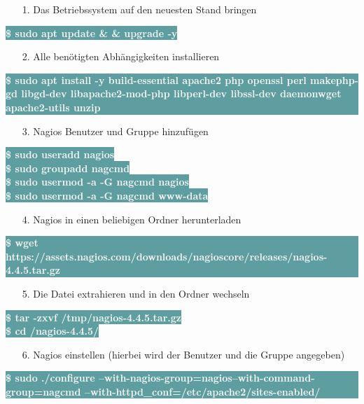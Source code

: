 \documentclass[fontsize=12pt,paper=a4,open=any,parskip=half,
  twoside=false,toc=listof,toc=bibliography,fleqn,leqno,
  captions=nooneline,captions=tableabove,british]{scrbook}
\begin{document}
\begin{itemize}
\item[1.] Das Betriebssystem auf den neuesten Stand bringen
\end{itemize}
\colorbox{CadetBlue}{\textcolor{white}{\textbf{\textsf{\$ sudo apt update \& \& upgrade -y}}}}
\begin{itemize}
\item[2.] Alle benötigten Abhängigkeiten installieren
\end{itemize}
\colorbox{CadetBlue}{\parbox{\myboxwidth}{\textbf{\textsf{\textcolor{white}{\$ sudo apt install \hyp{}y build\hyp{}essential apache2 php openssl perl makephp\hyp{}gd libgd\hyp{}dev libapache2\hyp{}mod\hyp{}php libperl\hyp{}dev libssl\hyp{}dev daemonwget apache2\hyp{}utils unzip}}}}}
\begin{itemize}
\item[3.] Nagios Benutzer und Gruppe hinzufügen
\end{itemize}
\colorbox{CadetBlue}{\textcolor{white}{\textbf{\textsf{\$ sudo useradd nagios}}}}\\
\colorbox{CadetBlue}{\textcolor{white}{\textbf{\textsf{\$ sudo groupadd nagcmd}}}}\\
\colorbox{CadetBlue}{\textcolor{white}{\textbf{\textsf{\$ sudo usermod -a -G nagcmd nagios}}}}\\
\colorbox{CadetBlue}{\textcolor{white}{\textbf{\textsf{\$ sudo usermod -a -G nagcmd www-data}}}}
\begin{itemize}
\item[4.] Nagios in einen beliebigen Ordner herunterladen
\end{itemize}
\colorbox{CadetBlue}{\parbox{\myboxwidth}{\textbf{\textsf{\textcolor{white}{\$ wget https://assets.nagios.com/downloads/nagioscore/releases/nagios-4.4.5.tar.gz}}}}}
\begin{itemize}
\item[5.] Die Datei extrahieren und in den Ordner wechseln
\end{itemize}
\colorbox{CadetBlue}{\textcolor{white}{\textbf{\textsf{\$ tar -zxvf /tmp/nagios-4.4.5.tar.gz}}}}\\
\colorbox{CadetBlue}{\textcolor{white}{\textbf{\textsf{\$ cd /nagios-4.4.5/}}}}
\begin{itemize}
\item[6.] Nagios einstellen (hierbei wird der Benutzer und die Gruppe angegeben)
\end{itemize}
\colorbox{CadetBlue}{\parbox{\myboxwidth}{\textbf{\textsf{\textcolor{white}{\$ sudo ./configure --with-nagios-group=nagios--with-command-group=nagcmd --with-httpd\_conf=/etc/apache2/sites-enabled/}}}}}
\end{document}
